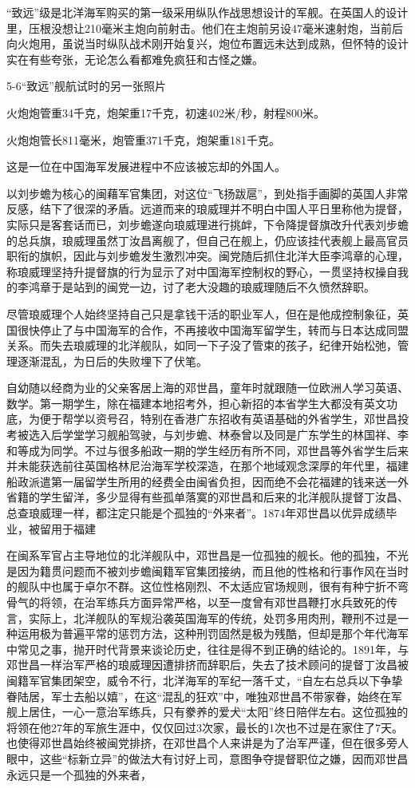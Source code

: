 \documentclass[12pt,UTF8]{ctexbook}
\begin{document}
“致远”级是北洋海军购买的第一级采用纵队作战思想设计的军舰。在英国人的设计里，压根没想让210毫米主炮向前射击。他们在主炮前另设47毫米速射炮，当前后向火炮用，虽说当时纵队战术刚开始复兴，炮位布置远未达到成熟，但怀特的设计实在有些夸张，无论怎么看都难免疯狂和古怪之嫌。

5-6“致远”舰航试时的另一张照片

火炮炮管重34千克，炮架重17千克，初速402米/秒，射程800米。

火炮炮管长811毫米，炮管重371千克，炮架重181千克。


这是一位在中国海军发展进程中不应该被忘却的外国人。

以刘步蟾为核心的闽藉军官集团，对这位“飞扬跋扈”，到处指手画脚的英国人非常反感，结下了很深的矛盾。远道而来的琅威理并不明白中国人平日里称他为提督，实际只是客套话而已，刘步蟾遂向琅威理进行挑衅，下令降提督旗改升代表刘步蟾的总兵旗，琅威理虽然丁汝昌离舰了，但自己在舰上，仍应该挂代表舰上最高官员职衔的旗帜，因此与刘步蟾发生激烈冲突。闽党随后抓住北洋大臣李鸿章的心理，称琅威理坚持升提督旗的行为显示了对中国海军控制权的野心，一贯坚持权操自我的李鸿章于是站到的闽党一边，讨了老大没趣的琅威理随后不久愤然辞职。

尽管琅威理个人始终坚持自己只是拿钱干活的职业军人，但在是他成控制象征，英国很快停止了与中国海军的合作，不再接收中国海军留学生，转而与日本达成同盟关系。而失去琅威理的北洋舰队，如同一下子没了管束的孩子，纪律开始松弛，管理逐渐混乱，为日后的失败埋下了伏笔。

自幼随以经商为业的父亲客居上海的邓世昌，童年时就跟随一位欧洲人学习英语、数学。第一期学生，除在福建本地招考外，担心新招的本省学生大都没有英文功底，为便于帮学以资号召，特别在香港广东招收有英语基础的外省学生，邓世昌投考被选入后学堂学习舰船驾驶，与刘步蟾、林泰曾以及同是广东学生的林国祥、李和等成为同学。不过与很多船政一期的学生经历有所不同，邓世昌等外省学生后来并未能获选前往英国格林尼治海军学校深造，在那个地域观念深厚的年代里，福建船政派遣第一届留学生所用的经费全由闽省负担，因而绝不会花福建的钱来送一外省籍的学生留洋，多少显得有些孤单落寞的邓世昌和后来的北洋舰队提督丁汝昌、总查琅威理一样，都注定只能是个孤独的“外来者”。1874年邓世昌以优异成绩毕业，被留用于福建

在闽系军官占主导地位的北洋舰队中，邓世昌是一位孤独的舰长。他的孤独，不光是因为籍贯问题而不被刘步蟾闽籍军官集团接纳，而且他的性格和行事作风在当时的舰队中也属于卓尔不群。这位性格刚烈、不太适应官场规则，很有有种宁折不弯骨气的将领，在治军练兵方面异常严格，以至一度曾有邓世昌鞭打水兵致死的传言，实际上，北洋舰队的军规沿袭英国海军的传统，处罚多用肉刑，鞭刑不过是一种运用极为普遍平常的惩罚方法，这种刑罚固然是极为残酷，但却是那个年代海军中常见之事，抛开时代背景来谈论历史，往往是得不到正确的结论的。1891年，与邓世昌一样治军严格的琅威理因遭排挤而辞职后，失去了技术顾问的提督丁汝昌被闽籍军官集团架空，威令不行，北洋海军的军纪一落千丈，“自左右总兵以下争挚眷陆居，军士去船以嬉”，在这“混乱的狂欢”中，唯独邓世昌不带家眷，始终在军舰上居住，一心一意治军练兵，只有豢养的爱犬“太阳”终日陪伴左右。这位孤独的将领在他27年的军旅生涯中，仅仅回过3次家，最长的1次也不过是在家住了7天。也使得邓世昌始终被闽党排挤，在邓世昌个人来讲是为了治军严谨，但在很多旁人眼中，这些“标新立异”的做法大有讨好上司，意图争夺提督职位之嫌，因而邓世昌永远只是一个孤独的外来者，
\end{document}
